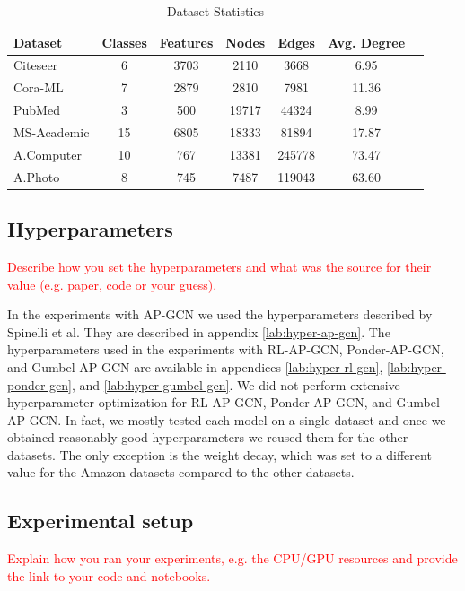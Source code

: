 \documentclass{gdl}
\begin{document}
\begin{table}[h]
    \small\sf
    \setlength{\tabcolsep}{2pt}
    \caption{Dataset Statistics}
    \begin{tabular}{l c c c c c c}
        \toprule
        Dataset & Classes & Features & Nodes & Edges & Avg. Degree \\
        \midrule
        Citeseer & 6 & 3703 & 2110 & 3668 & 6.95 \\
        Cora-ML & 7 & 2879 & 2810 & 7981 & 11.36 \\
        PubMed & 3 & 500 & 19717 &44324 &8.99 \\
        MS-Academic & 15&6805 & 18333 & 81894 & 17.87 \\
        A.Computer & 10 & 767 & 13381 & 245778 & 73.47 \\
        A.Photo  & 8 & 745 & 7487 & 119043 & 63.60 \\
        \bottomrule
    \end{tabular}
    \label{tab:dataset_statistics}
\end{table}

\subsection{Hyperparameters}
\textcolor{red}{Describe how you set the hyperparameters and what was the source for their value (e.g. paper, code or your guess). }

In the experiments with AP-GCN we used the hyperparameters described by Spinelli et al. They are described in appendix \ref{lab:hyper-ap-gcn}. The hyperparameters used in the experiments with RL-AP-GCN, Ponder-AP-GCN, and Gumbel-AP-GCN are available in appendices \ref{lab:hyper-rl-gcn}, \ref{lab:hyper-ponder-gcn}, and \ref{lab:hyper-gumbel-gcn}. We did not perform extensive hyperparameter optimization for RL-AP-GCN, Ponder-AP-GCN, and Gumbel-AP-GCN. In fact, we mostly tested each model on a single dataset and once we obtained reasonably good hyperparameters we reused them for the other datasets. The only exception is the weight decay, which was set to a different value for the Amazon datasets compared to the other datasets.

\subsection{Experimental setup}
\label{sec:experimental-setup}
\textcolor{red}{Explain how you ran your experiments, e.g. the CPU/GPU resources and provide the link to your code and notebooks.}
\end{document}
